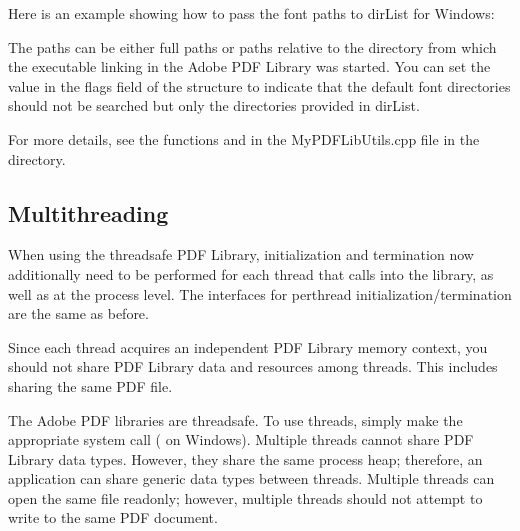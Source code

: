 \documentclass[letterpaper,12pt,english,openany,oneside]{sphinxmanual}
\begin{document}
Here is an example showing how to pass the font paths to dirList for Windows:

\begin{sphinxVerbatim}[commandchars=\\\{\}]
\PYG{p}{[}\PYG{p}{]} 
 \PYG{p}{[}\PYG{p}{]} 
 \PYG{p}{[}\PYG{p}{]} 
\end{sphinxVerbatim}

The paths can be either full paths or paths relative to the directory from which the executable linking in the Adobe PDF Library was started. You can set the value  in the flags field of the  structure to indicate that the default font directories should not be searched but only the directories provided in dirList.

For more details, see the functions  and  in the MyPDFLibUtils.cpp file in the  directory.


\subsection{Multithreading}
\label{\detokenize{Plugins_CreatingSimplePlug:multithreading}}
When using the thread\sphinxhyphen{}safe PDF Library, initialization and termination now additionally need to be performed for each thread that calls into the library, as well as at the process level. The interfaces for per\sphinxhyphen{}thread initialization/termination are the same as before.

Since each thread acquires an independent PDF Library memory context, you should not share PDF Library data and resources among threads. This includes sharing the same PDF file.

The Adobe PDF libraries are thread\sphinxhyphen{}safe. To use threads, simply make the appropriate system call ( on Windows). Multiple threads cannot share PDF Library data types. However, they share the same process heap; therefore, an application can share generic data types between threads. Multiple threads can open the same file read\sphinxhyphen{}only; however, multiple threads should not attempt to write to the same PDF document.
\end{document}
